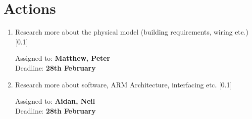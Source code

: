 \documentclass[11pt,a4paper]{article}
\begin{document}
\section*{Actions}

\begin{enumerate}

\item Research more about the physical model (building requirements, wiring etc.) [0.1]
\begin{flushright}
Assigned to: \textbf{Matthew, Peter} \\
Deadline: \textbf{28th February}
\end{flushright}

\item Research more about software, ARM Architecture, interfacing etc. [0.1]
\begin{flushright}
Assigned to: \textbf{Aidan, Neil} \\
Deadline: \textbf{28th February}
\end{flushright}


\end{enumerate}
\end{document}
